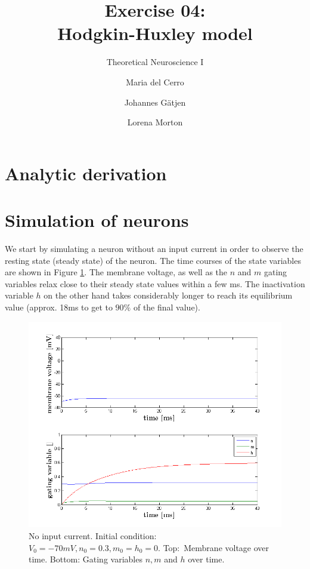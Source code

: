 \documentclass{scrartcl}
\title{Exercise 04:\\Hodgkin-Huxley model}
\subtitle{Theoretical Neuroscience I}
\author{Maria del Cerro \and Johannes G\"atjen \and Lorena Morton}
\begin{document}
\maketitle
\section{Analytic derivation}

\section{Simulation of neurons}

We start by simulating a neuron without an input current in order to observe the resting state (steady state) of the neuron. The time courses of the state variables are shown in Figure \ref{zero}. The membrane voltage, as well as the $n$ and $m$ gating variables relax close to their steady state values within a few \si{ms}. The inactivation variable $h$ on the other hand takes considerably longer to reach its equilibrium value (approx. 18\si{ms} to get to $90\%$ of the final value).


\begin{figure}
\centering
\includegraphics[trim = {1.4cm 0.3 1.8cm 1cm}, height=0.35\textheight, clip]{../pics/zero}
\caption{No input current. Initial condition: $V_0 = -70\si{mV}, n_0 = 0.3, m_0 = h_0 = 0$. Top:~Membrane voltage over time. Bottom: Gating variables $n, m$ and $h$ over time.}
\label{zero}
\end{figure}
\end{document}

